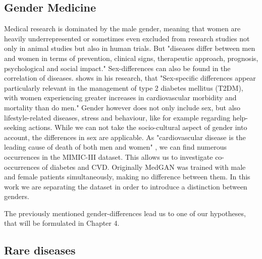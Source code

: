 \documentclass[11pt, a4paper]{book}
\begin{document}
\subsection{Gender Medicine}
Medical research is dominated by the male gender, meaning that women are heavily underrepresented or sometimes even excluded from research studies not only in animal studies but also in human trials. \cite{baggio2013gender} 
But "diseases  differ  between  men  and  women  in  terms  of  prevention,  clinical  signs,  therapeutic  approach,  prognosis,  psychological  and  social  impact." \cite{baggio2013gender}
Sex-differences can also be found in the correlation of diseases. \cite{kautzky2010sex} shows in his research, that "Sex-specific differences appear particularly relevant in the management of type 2 diabetes mellitus (T2DM), with women experiencing greater increases in cardiovascular morbidity and mortality than do men." \cite{kautzky2010sex}
Gender however does not only include sex, but also lifestyle-related diseases, stress and behaviour, like for example regarding help-seeking actions.
While we can not take the socio-cultural aspect of gender into account, the differences in sex are applicable.
As "cardiovascular disease is the leading cause of death of both men and women" \cite{arain2009sex}, we can find numerous occurrences in the MIMIC-III dataset. This allows us to investigate co-occurrences of diabetes and CVD.
Originally MedGAN was trained with male and female patients simultaneously, making no difference between them. In this work we are separating the dataset in order to introduce a distinction between genders.

The previously mentioned gender-differences lead us to one of our hypotheses, that will be formulated in Chapter 4.

\subsection{Rare diseases}
\end{document}
